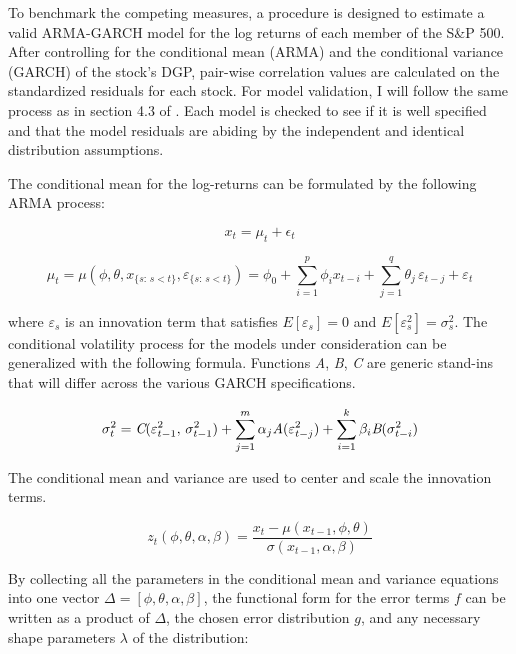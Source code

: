\documentclass[12pt]{report}
\begin{document}
To benchmark the competing measures, a procedure is designed to estimate a valid ARMA-GARCH model for the log returns of each member of the S\&P 500. After controlling for the conditional mean (ARMA) and the conditional variance (GARCH) of the stock's DGP, pair-wise correlation values are calculated on the standardized residuals for each stock. For model validation, I will follow the same process as in section 4.3 of \cite{DowiakTV-COP}. Each model is checked to see if it is well specified and that the model residuals are abiding by the independent and identical distribution assumptions.

The conditional mean for the log-returns can be formulated by the following ARMA process:

\begin{equation} \label{eqn:marginalModel}
    x_{t} = \mu_{t} + \epsilon_{t}
\end{equation}

\begin{equation} \label{eq:conditional_mean}
    \mu_{t} = \mu(\phi, \theta, x_{\{s:\, s < t\}}, \varepsilon_{\{s:\, s < t\}}) = \phi_{0} + \sum_{i=1}^{p} \phi_{i} x_{t-i} + \sum_{j=1}^{q} \theta_{j} \, \varepsilon_{t - j} + \varepsilon_{t}
\end{equation}

where $\varepsilon_{s}$ is an innovation term that satisfies $E[\varepsilon_{s}] = 0$ and $E[\varepsilon^{2}_{s}] = \sigma^{2}_{s}$. The conditional volatility process for the models under consideration can be generalized with the following formula. Functions \emph{A}, \emph{B}, \emph{C} are generic stand-ins that will differ across the various GARCH specifications.

\begin{equation} \label{eq:conditional_var}
    \sigma^{2}_{t} = \emph{C}(\varepsilon^{2}_{t-1}, \, \sigma^{2}_{t-1}) + \sum_{j=1}^{m} \alpha_{j} \emph{A}(\varepsilon^{2}_{t - j}) + \sum_{i=1}^{k} \beta_{i} \emph{B}(\sigma^{2}_{t - i})
\end{equation}

The conditional mean and variance are used to center and scale the innovation terms.

\begin{equation} \label{eq:z_score_returns}
    z_{t}(\phi, \theta, \alpha, \beta) = \frac{x_{t} - \mu(x_{t-1}, \phi, \theta)}{\sigma(x_{t-1}, \alpha, \beta)}
\end{equation}

By collecting all the parameters in the conditional mean and variance equations into one vector $\Delta = [\phi, \theta, \alpha, \beta]$, the functional form for the error terms $f$ can be written as a product of $\Delta$, the chosen error distribution $g$, and any necessary shape parameters $\lambda$ of the distribution:
\end{document}

